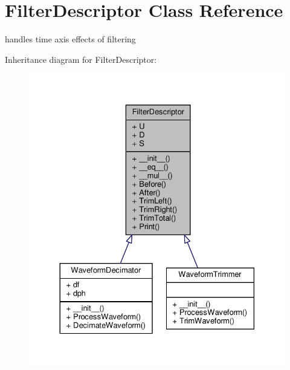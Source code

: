 \hypertarget{classSignalIntegrity_1_1TimeDomain_1_1Filters_1_1FilterDescriptor_1_1FilterDescriptor}{}\section{Filter\+Descriptor Class Reference}
\label{classSignalIntegrity_1_1TimeDomain_1_1Filters_1_1FilterDescriptor_1_1FilterDescriptor}


handles time axis effects of filtering  




Inheritance diagram for Filter\+Descriptor\+:
\nopagebreak
\begin{figure}[H]
\begin{center}
\leavevmode
\includegraphics[width=330pt]{classSignalIntegrity_1_1TimeDomain_1_1Filters_1_1FilterDescriptor_1_1FilterDescriptor__inherit__graph}
\end{center}
\end{figure}


